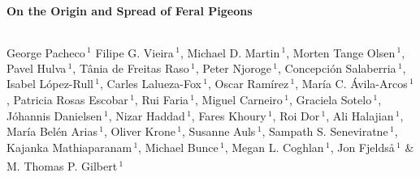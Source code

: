 \documentclass[a4paper]{article}
\begin{document}
\begin{center}
\noindent \LARGE \bfseries {} On the Origin and Spread of Feral Pigeons \\
\end{center}

\hfill\break

\begin{lstlisting}
\end{lstlisting}


 \small \noindent 
George Pacheco\,$^{1}$\textsuperscript{\faEnvelopeO} %
Filipe G. Vieira\,$^{1}$,
Michael D. Martin\,$^{1}$,
Morten Tange Olsen\,$^{1}$,
Pavel Hulva\,$^{1}$,
Tânia de Freitas Raso\,$^{1}$,
Peter Njoroge\,$^{1}$,
Concepción Salaberria\,$^{1}$,
Isabel López-Rull\,$^{1}$,
Carles Lalueza-Fox\,$^{1}$,
Oscar Ramírez\,$^{1}$,
María C. Ávila-Arcos\,$^{1}$,
Patricia Rosas Escobar\,$^{1}$,
Rui Faria\,$^{1}$,
Miguel Carneiro\,$^{1}$,
Graciela Sotelo\,$^{1}$,
Jóhannis Danielsen\,$^{1}$,
Nizar Haddad\,$^{1}$,
Fares Khoury\,$^{1}$,
Roi Dor\,$^{1}$,
Ali Halajian\,$^{1}$,
María Belén Arias\,$^{1}$,
Oliver Krone\,$^{1}$,
Susanne Auls\,$^{1}$,
Sampath S. Seneviratne\,$^{1}$,
Kajanka Mathiaparanam\,$^{1}$,
Michael Bunce\,$^{1}$,
Megan L. Coghlan\,$^{1}$,
Jon Fjeldså\,$^{1}$ \&
M. Thomas P. Gilbert\,$^{1}$\textsuperscript{\faEnvelopeO}
\end{document}
